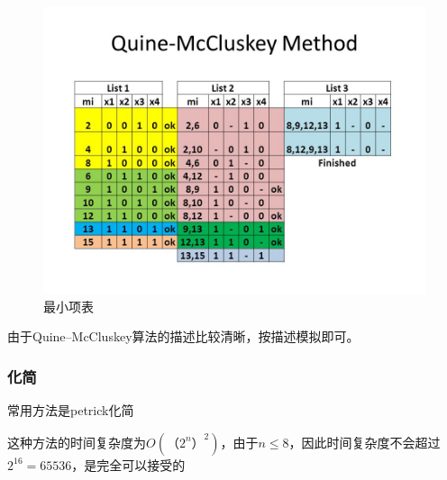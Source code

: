 	\begin{figure}[h]
		\centering
		\includegraphics[scale=0.5]{images/QM.jpg}
		\caption{最小项表}
	\end{figure}
	
	由于Quine–McCluskey算法的描述比较清晰，按描述模拟即可。
	
		

\subsubsection{化简}
	常用方法是petrick化简
	
	这种方法的时间复杂度为$O(（2^n）^2)$，由于$n \le 8$，因此时间复杂度不会超过$2 ^ {16} = 65536$，是完全可以接受的
	
		
